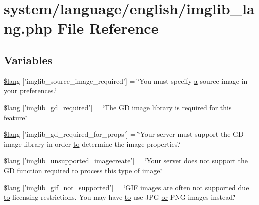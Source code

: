 \hypertarget{imglib__lang_8php}{\section{system/language/english/imglib\-\_\-lang.php File Reference}
\label{imglib__lang_8php}
}
\subsection*{Variables}
\begin{DoxyCompactItemize}
\item 
\hyperlink{imglib__lang_8php_af48787ab142f633036ebdf1cc5da7409}{\$lang} \mbox{[}'imglib\-\_\-source\-\_\-image\-\_\-required'\mbox{]} = \char`\"{}You must specify \hyperlink{bootstrap_8min_8js_a7318f59fb86a4437995ee89c780c51ac}{a} source image in your preferences.\char`\"{}
\item 
\hyperlink{imglib__lang_8php_aa8d7f8276e62fbe759daef2021c16552}{\$lang} \mbox{[}'imglib\-\_\-gd\-\_\-required'\mbox{]} = \char`\"{}The G\-D image library is required \hyperlink{mathquill_8js_a6051bae356f28cb834303745ad2f4d86}{for} this feature.\char`\"{}
\item 
\hyperlink{imglib__lang_8php_a0da9c99f9e2b5f38ccbefb9d9f702c5e}{\$lang} \mbox{[}'imglib\-\_\-gd\-\_\-required\-\_\-for\-\_\-props'\mbox{]} = \char`\"{}Your server must support the G\-D image library in order \hyperlink{mathquill_8js_ae3622f38202b3532cd6eae25726945f8}{to} determine the image properties.\char`\"{}
\item 
\hyperlink{imglib__lang_8php_ace032cbe8dafb1f3417a758d0914ecdb}{\$lang} \mbox{[}'imglib\-\_\-unsupported\-\_\-imagecreate'\mbox{]} = \char`\"{}Your server does \hyperlink{mathquill_8js_ac1e1ab538c27d68cc2cbafea74e7412c}{not} support the G\-D function required \hyperlink{mathquill_8js_ae3622f38202b3532cd6eae25726945f8}{to} process this type of image.\char`\"{}
\item 
\hyperlink{imglib__lang_8php_a235a59a6660145fc136b3933b5b10675}{\$lang} \mbox{[}'imglib\-\_\-gif\-\_\-not\-\_\-supported'\mbox{]} = \char`\"{}G\-I\-F images are often \hyperlink{mathquill_8js_ac1e1ab538c27d68cc2cbafea74e7412c}{not} supported due \hyperlink{mathquill_8js_ae3622f38202b3532cd6eae25726945f8}{to} licensing restrictions. You may have \hyperlink{mathquill_8js_ae3622f38202b3532cd6eae25726945f8}{to} use J\-P\-G \hyperlink{mathquill_8js_a6fdf1c439b25d95597e99492b728acaa}{or} P\-N\-G images instead.\char`\"{}

\end{DoxyCompactItemize}
